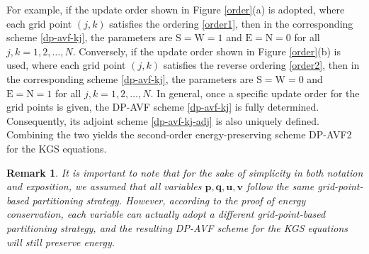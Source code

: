 \documentclass[fleqn,11pt]{elsarticle}
\numberwithin{equation}{section}
\newtheorem{rmk}{Remark}[section]
\begin{document}
For example, if the update order shown in Figure \ref{order}(a) is adopted, where each grid point $(j, k)$ satisfies the ordering \eqref{order1}, then in the corresponding scheme \eqref{dp-avf-kj}, the parameters are $\text{S} = \text{W} = 1$ and $\text{E} = \text{N} = 0$ for all $j, k = 1, 2, \dots, N$. Conversely, if the update order shown in Figure \ref{order}(b) is used, where each grid point $(j, k)$ satisfies the reverse ordering \eqref{order2}, then in the corresponding scheme \eqref{dp-avf-kj}, the parameters are $\text{S} = \text{W} = 0$ and $\text{E} = \text{N} = 1$ for all $j, k = 1, 2, \dots, N$.  In general, once a specific update order for the grid points is given, the DP-AVF scheme \eqref{dp-avf-kj} is fully determined. Consequently, its adjoint scheme \eqref{dp-avf-kj-adj} is also uniquely defined. Combining the two yields the second-order energy-preserving scheme DP-AVF2 for the KGS equations.


\begin{rmk}
	It is important to note that for the sake of simplicity in both notation and exposition, we assumed that all variables $\bm{p}, \bm{q}, \bm{u}, \bm{v}$ follow the same grid-point-based partitioning strategy. However, according to the proof of energy conservation, each variable can actually adopt a different grid-point-based partitioning strategy, and the resulting DP-AVF scheme for the KGS equations will still preserve energy.
\end{rmk}
\end{document}
